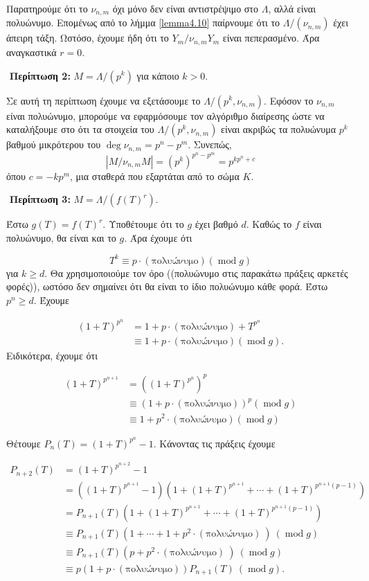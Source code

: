 \noindent Παρατηρούμε ότι το $\nu_{n,m}$ όχι μόνο δεν είναι αντιστρέψιμο στο $\Lambda$, αλλά είναι  πολυώνυμο. Επομένως από το λήμμα \ref{lemma4.10} παίρνουμε ότι το $\Lambda/(\nu_{n,m})$ έχει άπειρη τάξη. Ωστόσο, έχουμε ήδη ότι το $Y_m/\nu_{n,m}Y_m$ είναι πεπερασμένο. Άρα αναγκαστικά $r=0$.

$ $\newline
\textbf{Περίπτωση 2:} $M = \Lambda/(p^k)$ για κάποιο $k>0$.

\noindent Σε αυτή τη περίπτωση έχουμε να εξετάσουμε το $\Lambda/(p^k,\nu_{n,m})$. Εφόσον το $\nu_{n,m}$ είναι  πολυώνυμο, μπορούμε να εφαρμόσουμε τον αλγόριθμο διαίρεσης ώστε να καταλήξουμε στο ότι τα στοιχεία του $\Lambda/(p^k,\nu_{n,m})$ είναι ακριβώς τα πολυώνυμα  $p^k$ βαθμού μικρότερου του $\deg \nu_{n,m} = p^n - p^m$. Συνεπώς,
$$|M/\nu_{n,m}M| = (p^k)^{p^n-p^m} = p^{kp^n+c}$$ όπου $c=-kp^m$, μια σταθερά που εξαρτάται από το σώμα $K$.

$ $\newline
\textbf{Περίπτωση 3:} $M = \Lambda/(f(T)^r)$.

\noindent Έστω $g(T) = f(T)^r$. Υποθέτουμε ότι το $g$ έχει βαθμό $d$. Καθώς το $f$ είναι  πολυώνυμο, θα είναι και το $g$. Άρα έχουμε ότι

$$T^k \equiv p \cdot (\text{πολυώνυμο}) (\operatorname{mod}g) $$ για $k\geq d$. Θα χρησιμοποιούμε τον όρο ((πολυώνυμο στις παρακάτω πράξεις αρκετές φορές)), ωστόσο δεν σημαίνει ότι θα είναι το ίδιο πολυώνυμο κάθε φορά. Έστω $p^n \geq d$. Έχουμε

\begin{align*}
    (1+T)^{p^n} &= 1+ p \cdot (\text{πολυώνυμο}) + T^{p^n} \\ 
    &\equiv 1 +  p \cdot (\text{πολυώνυμο}) (\operatorname{mod}g).
\end{align*} Ειδικότερα, έχουμε ότι

\begin{align*}
    (1+T)^{p^{n+1}} &= \left((1+T)^{p^n}\right)^p \\ 
    &\equiv \left(1+p \cdot (\text{πολυώνυμο})\right)^p (\operatorname{mod}g) \\
    &\equiv 1+p^2 \cdot (\text{πολυώνυμο}) (\operatorname{mod}g)
\end{align*}

\noindent Θέτουμε $P_n(T) = (1+T)^{p^n}-1$. Κάνοντας τις πράξεις έχουμε

\begin{align*}
    P_{n+2}(T) & = \left(1+T\right)^{p^{n+2}} -1 \\
    &= \left( (1+T)^{p^{n+1}} - 1\right)\left(1+( 1+T)^{p^{n+1}} + \cdots + (1+T)^{p^{n+1}(p-1)}\right) \\
    &= P_{n+1}(T) \left(1+(1+T)^{p^{n+1}} + \cdots + (1+T)^{p^{n+1}(p-1)}\right) \\
    &\equiv P_{n+1}(T) (1+\cdots + 1 + p^2 \cdot (\text{πολυώνυμο})\ ) \ (\operatorname{mod}g)\\
    &\equiv P_{n+1}(T) (p+p^2 \cdot (\text{πολυώνυμο}) \ ) \ (\operatorname{mod}g) \\
    &\equiv p(1+p\cdot (\text{πολυώνυμο}))P_{n+1}(T) \ (\operatorname{mod}g).
\end{align*}


